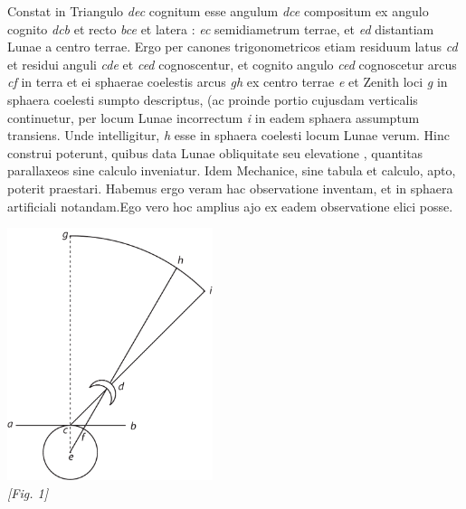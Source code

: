 Constat in Triangulo \textit{dec} cognitum esse angulum  \textit{dce} compositum ex angulo cognito \textit{dcb} et recto \textit{bce} et  latera : \textit{ec} semidiametrum terrae, et \textit{ed} distantiam Lunae\protect{} a centro terrae. Ergo per canones trigonometricos etiam  residuum latus \textit{cd} et  residui anguli \textit{cde} et \textit{ced} cognoscentur, et cognito angulo \textit{ced} cognoscetur arcus \textit{cf} in terra et ei  sphaerae coelestis arcus \textit{gh} ex centro terrae \textit{e} et Zenith loci \textit{g} in sphaera coelesti sumpto descriptus, (ac proinde  portio cujusdam verticalis  continuetur, per locum Lunae\protect{} incorrectum \textit{i} in eadem sphaera assumptum transiens. Unde intelligitur, \textit{h} esse in sphaera coelesti locum Lunae\protect{} verum. Hinc  construi poterunt, quibus data Lunae\protect{} obliquitate seu elevatione , quantitas parallaxeos\protect{} sine calculo inveniatur. Idem Mechanice, sine tabula et calculo,  apto, poterit praestari. Habemus ergo veram \protect{} \protect{}hac observatione inventam, et in sphaera artificiali notandam.\pend \pstart Ego vero hoc amplius ajo ex eadem observatione  elici posse.\pend \clearpage
   \hspace{0.5ex}
   \begin{center}
   \includegraphics[width=0.45\textwidth]{images/35_15_6_71rfig1}
   \\\centering\textit{[Fig. 1]}
   \end{center}
 \pstart 